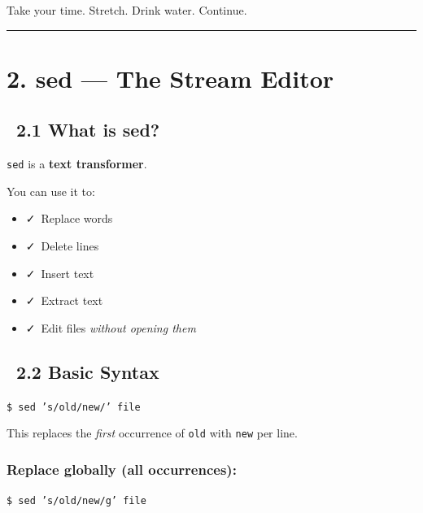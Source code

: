 \documentclass[12pt]{article}
\newcommand{\brainicon}{\faBrain}
\newcommand{\toolicon}{\faTools}
\newcommand{\checkicon}{\faCheck}
\begin{document}
\begin{infobox}
Take your time. Stretch. Drink water. Continue.
\end{infobox}

\vspace{1em}
\begin{center}
\color{teamred}\rule{0.8\textwidth}{1pt}
\end{center}

\section*{2. sed — The Stream Editor}

\subsection*{\toolicon\ 2.1 What is sed?}

\texttt{sed} is a \textbf{text transformer}.

You can use it to:

\begin{itemize}
    \item \checkicon\ Replace words
    \item \checkicon\ Delete lines
    \item \checkicon\ Insert text
    \item \checkicon\ Extract text
    \item \checkicon\ Edit files \textit{without opening them}
\end{itemize}

\subsection*{\brainicon\ 2.2 Basic Syntax}

\begin{highlightbox}
\texttt{\$ sed 's/old/new/' file}
\end{highlightbox}

This replaces the \textit{first} occurrence of \texttt{old} with \texttt{new} per line.

\subsubsection*{Replace globally (all occurrences):}

\begin{highlightbox}
\texttt{\$ sed 's/old/new/g' file}
\end{highlightbox}
\end{document}
